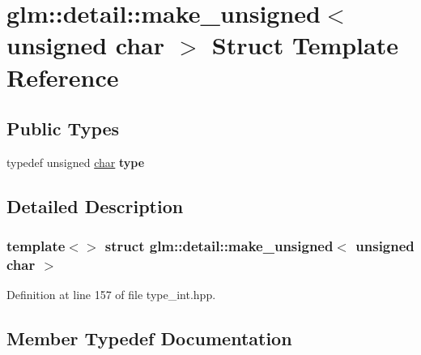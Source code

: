 \hypertarget{structglm_1_1detail_1_1make__unsigned_3_01unsigned_01char_01_4}{}\section{glm\+:\+:detail\+:\+:make\+\_\+unsigned$<$ unsigned char $>$ Struct Template Reference}
\label{structglm_1_1detail_1_1make__unsigned_3_01unsigned_01char_01_4}
\subsection*{Public Types}
\begin{DoxyCompactItemize}
\item 
\mbox{\label{structglm_1_1detail_1_1make__unsigned_3_01unsigned_01char_01_4_a783a55dc0559d4b972a0d85cf08256f2}} 
typedef unsigned \hyperlink{classchar}{char} {\bfseries type}
\end{DoxyCompactItemize}


\subsection{Detailed Description}
\subsubsection*{template$<$$>$\newline
struct glm\+::detail\+::make\+\_\+unsigned$<$ unsigned char $>$}



Definition at line 157 of file type\+\_\+int.\+hpp.



\subsection{Member Typedef Documentation}
\mbox{\label{structglm_1_1detail_1_1make__unsigned_3_01unsigned_01char_01_4_a783a55dc0559d4b972a0d85cf08256f2}} 
